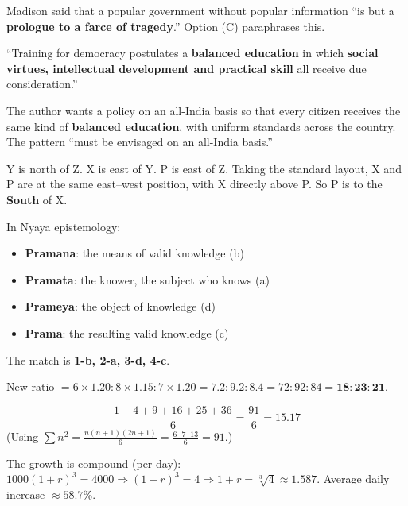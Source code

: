 Madison said that a popular government without popular information ``is but a \textbf{prologue to a farce of tragedy}.'' Option (C) paraphrases this.

``Training for democracy postulates a \textbf{balanced education} in which \textbf{social virtues, intellectual development and practical skill} all receive due consideration.''

The author wants a policy on an all-India basis so that every citizen receives the same kind of \textbf{balanced education}, with uniform standards across the country. The pattern ``must be envisaged on an all-India basis.''

\begin{center}
\end{center}
Y is north of Z. X is east of Y. P is east of Z. Taking the standard layout, X and P are at the same east--west position, with X directly above P. So P is to the \textbf{South} of X.

In Nyaya epistemology:
\begin{itemize}
\item \textbf{Pramana}: the means of valid knowledge (b)
\item \textbf{Pramata}: the knower, the subject who knows (a)
\item \textbf{Prameya}: the object of knowledge (d)
\item \textbf{Prama}: the resulting valid knowledge (c)
\end{itemize}
The match is \textbf{1-b, 2-a, 3-d, 4-c}.

New ratio $=6\times1.20 : 8\times1.15 : 7\times1.20=7.2:9.2:8.4=72:92:84=\mathbf{18:23:21}$.

\[\frac{1+4+9+16+25+36}{6}=\frac{91}{6}=\mathbf{15.17}\]
(Using $\sum n^2=\tfrac{n(n+1)(2n+1)}{6}=\tfrac{6\cdot7\cdot13}{6}=91$.)

The growth is compound (per day): $1000(1+r)^3=4000\Rightarrow(1+r)^3=4\Rightarrow1+r=\sqrt[3]4\approx1.587$.
Average daily increase $\approx\mathbf{58.7\%}$.
